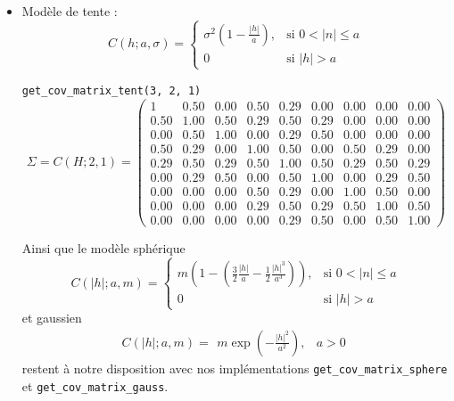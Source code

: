 \documentclass[10pt]{article} %
\begin{document}
\begin{itemize}
    \item[] Modèle de tente :
    \[
        C(h; a, \sigma) = \left\{\begin{array}{lr}
            \sigma^2(1 - \frac{|h|}{a}), & \text{si } 0< |n|\leq a\\
            0 & \text{si } |h| > a
            \end{array}\right.
    \]

    \texttt{get\_cov\_matrix\_tent(3, 2, 1)}
    $$
    \Sigma = C(H; 2, 1) =
    \begin{pmatrix}
    1 & 0.50 & 0.00 & 0.50 & 0.29 & 0.00 & 0.00 & 0.00 & 0.00 \\
    0.50                       & 1.00 & 0.50 & 0.29 & 0.50 & 0.29 & 0.00 & 0.00 & 0.00 \\
    0.00                       & 0.50 & 1.00 & 0.00 & 0.29 & 0.50 & 0.00 & 0.00 & 0.00 \\
    0.50                       & 0.29 & 0.00 & 1.00 & 0.50 & 0.00 & 0.50 & 0.29 & 0.00 \\
    0.29                       & 0.50 & 0.29 & 0.50 & 1.00 & 0.50 & 0.29 & 0.50 & 0.29 \\
    0.00                       & 0.29 & 0.50 & 0.00 & 0.50 & 1.00 & 0.00 & 0.29 & 0.50 \\
    0.00                       & 0.00 & 0.00 & 0.50 & 0.29 & 0.00 & 1.00 & 0.50 & 0.00 \\
    0.00                       & 0.00 & 0.00 & 0.29 & 0.50 & 0.29 & 0.50 & 1.00 & 0.50 \\
    0.00                       & 0.00 & 0.00 & 0.00 & 0.29 & 0.50 & 0.00 & 0.50 & 1.00
    \end{pmatrix}
    $$

    Ainsi que le modèle sphérique
    \[
        C(|h|; a, m) = \left\{\begin{array}{lr}
            m(1 - (\frac{3}{2}\frac{|h|}{a} - \frac{1}{2}\frac{|h|^3}{a^3})), & \text{si } 0< |n|\leq a\\
            0 & \text{si } |h| > a
            \end{array}\right.
    \]et gaussien
    \[
        C(|h|; a, m) = \begin{array}{lr}
            m \exp (- \frac{|h|^2}{a^2}), & a > 0
            \end{array}
    \]
    restent à notre disposition avec nos implémentations \texttt{get\_cov\_matrix\_sphere} et
    \texttt{get\_cov\_matrix\_gauss}.

\end{itemize}
\end{document}
